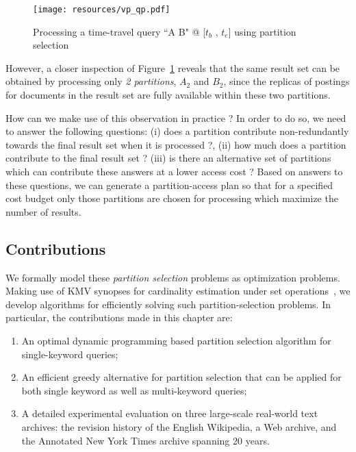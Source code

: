 \label{subsec:contributions}

  \begin{figure}[tb]
  \centering
    \texttt{[image: resources/vp\_qp.pdf]}
  \caption{Processing a time-travel query ``A B" @ [$t_b$ , $t_e$] using partition selection} 
    \label{fig:intro_example}
\end{figure}

However, a closer inspection of Figure~\ref{fig:intro_example} reveals
that the same result set can be obtained by processing only \emph{2
  partitions}, $A_2$ and $B_2$, since the replicas of
postings for documents in the result set are fully available within
these two partitions.

How can we make use of this observation in practice ? In order to do
so, we need to answer the following questions: (i) does a partition contribute non-redundantly towards the
final result set when it is processed ?, (ii) how much does a partition contribute to the final result set ? (iii) is there an alternative set of
partitions which can contribute these answers at a lower access
cost ? Based on answers to these questions, we can generate a partition-access plan so that for a specified cost budget only those
partitions are chosen for processing which maximize the number of
results.



\subsection{Contributions}

We formally model these \emph{partition selection} problems as optimization problems. Making use of KMV synopses for cardinality estimation
under set operations~\cite{kmv:sigmod}, we develop algorithms for efficiently
solving such partition-selection problems. In particular, the contributions made in this chapter are:

\begin{enumerate}
\item An optimal dynamic programming based partition selection algorithm for single-keyword queries;

\item An efficient greedy alternative for partition selection that can
  be applied for both single keyword as well as multi-keyword queries;

\item A detailed experimental evaluation on three large-scale real-world
  text archives: the revision history of the English Wikipedia, a Web archive, and the
  Annotated New York Times archive spanning 20 years.
\end{enumerate}

